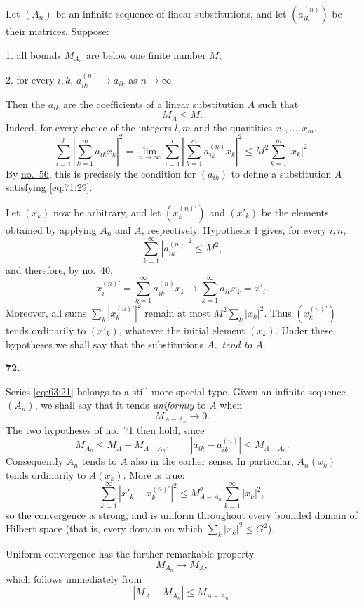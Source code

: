 \documentclass[
  paper=b5,
  fontsize=13pt,
  twoside=true,
  open=any,
  bookmarkpackage=false,
  chapterprefix=true,
  headings=normal
]{scrbook}
\theoremstyle{definition}
\newcommand{\numberedparagraph}[1]{%
  \par\medskip\phantomsection\label{sec:#1}%
  \noindent\textbf{#1.}\enspace
}
\begin{document}
Let $(A_n)$ be an infinite sequence of linear substitutions, and let
$(a_{ik}^{(n)})$ be their matrices. Suppose:

1. all bounds $M_{A_n}$ are below one finite number $M$;

2. for every $i,k$, $a_{ik}^{(n)}\to a_{ik}$ as $n\to\infty$.

Then the $a_{ik}$ are the coefficients of a linear substitution $A$ such
that
\begin{equation}
  M_A\leq M.
  \tag{29}\label{eq:71:29}
\end{equation}
Indeed, for every choice of the integers $l,m$ and the quantities
$x_1,\ldots,x_m$,
\[
 \sum_{i=1}^{l}\left|\sum_{k=1}^{m}a_{ik}x_k\right|^2
 =\lim_{n\to\infty}\sum_{i=1}^{l}
   \left|\sum_{k=1}^{m}a_{ik}^{(n)}x_k\right|^2
 \leq M^2\sum_{k=1}^{m}|x_k|^2.
\]
By \hyperref[sec:56]{no.~56}, this is precisely the condition for
$(a_{ik})$ to define a substitution $A$ satisfying \eqref{eq:71:29}.

Let $(x_k)$ now be arbitrary, and let $(x_k^{(n)\prime})$ and $(x'_k)$ be
the elements obtained by applying $A_n$ and $A$, respectively. Hypothesis
1 gives, for every $i,n$,
\[
  \sum_{k=1}^{\infty}|a_{ik}^{(n)}|^2\leq M^2,
\]
and therefore, by \hyperref[sec:40]{no.~40},
\[
 x_i^{(n)\prime}=\sum_{k=1}^{\infty}a_{ik}^{(n)}x_k
 \longrightarrow\sum_{k=1}^{\infty}a_{ik}x_k=x'_i.
\]
Moreover, all sums $\sum_k|x_k^{(n)\prime}|^2$ remain at most
$M^2\sum_k|x_k|^2$. Thus $(x_k^{(n)\prime})$ tends ordinarily to
$(x'_k)$, whatever the initial element $(x_k)$. Under these hypotheses we
shall say that the substitutions $A_n$ \emph{tend to} $A$.

\numberedparagraph{72}
Series \eqref{eq:63:21} belongs to a still more special type. Given an
infinite sequence $(A_n)$, we shall say that it tends \emph{uniformly} to
$A$ when
\[
  M_{A-A_n}\longrightarrow0.
\]
The two hypotheses of \hyperref[sec:71]{no.~71} then hold, since
\[
  M_{A_n}\leq M_A+M_{A-A_n},
  \qquad
  |a_{ik}-a_{ik}^{(n)}|\leq M_{A-A_n}.
\]
Consequently $A_n$ tends to $A$ also in the earlier sense.
In particular, $A_n(x_k)$ tends ordinarily to $A(x_k)$. More is true:
\[
 \sum_{k=1}^{\infty}|x'_k-x_k^{(n)\prime}|^2
 \leq M_{A-A_n}^2\sum_{k=1}^{\infty}|x_k|^2,
\]
so the convergence is strong, and is uniform throughout every bounded
domain of Hilbert space (that is, every domain on which
$\sum_k|x_k|^2\leq G^2$).

Uniform convergence has the further remarkable property
\[
  M_{A_n}\longrightarrow M_A,
\]
which follows immediately from
\[
  |M_A-M_{A_n}|\leq M_{A-A_n}.
\]
\end{document}
